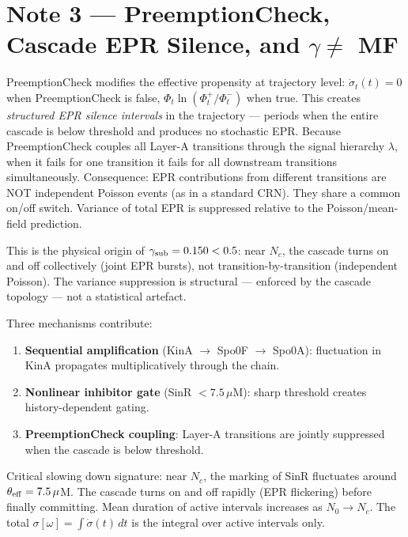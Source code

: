 \documentclass[11pt,a4paper]{article}
\newcommand{\EPR}{\dot{\sigma}}
\begin{document}
\section*{Note 3 — PreemptionCheck, Cascade EPR Silence, and $\gamma \neq$ MF}

PreemptionCheck modifies the effective propensity at trajectory level:
$\EPR_t(t) = 0$ when PreemptionCheck is false, $\Phi_t \ln(\Phi_t^+/
\Phi_t^-)$ when true. This creates \emph{structured EPR silence intervals}
in the trajectory — periods when the entire cascade is below threshold and
produces no stochastic EPR. Because PreemptionCheck couples all Layer-A
transitions through the signal hierarchy $\lambda$, when it fails for one
transition it fails for all downstream transitions simultaneously.
Consequence: EPR contributions from different transitions are NOT
independent Poisson events (as in a standard CRN). They share a common
on/off switch. Variance of total EPR is suppressed relative to the
Poisson/mean-field prediction.

This is the physical origin of $\gamma_{\rm sub} = 0.150 < 0.5$: near
$N_c$, the cascade turns on and off collectively (joint EPR bursts),
not transition-by-transition (independent Poisson). The variance
suppression is structural — enforced by the cascade topology — not a
statistical artefact.

Three mechanisms contribute:
\begin{enumerate}
  \item \textbf{Sequential amplification} (KinA $\to$ Spo0F $\to$ Spo0A):
    fluctuation in KinA propagates multiplicatively through the chain.
  \item \textbf{Nonlinear inhibitor gate} (SinR $< 7.5\,\mu$M):
    sharp threshold creates history-dependent gating.
  \item \textbf{PreemptionCheck coupling}: Layer-A transitions are jointly
    suppressed when the cascade is below threshold.
\end{enumerate}

Critical slowing down signature: near $N_c$, the marking of SinR
fluctuates around $\theta_{\rm eff} = 7.5\,\mu$M. The cascade turns on
and off rapidly (EPR flickering) before finally committing. Mean duration
of active intervals increases as $N_0 \to N_c$. The total
$\sigma[\omega] = \int \EPR(t)\,dt$ is the integral over active intervals
only.
\end{document}
